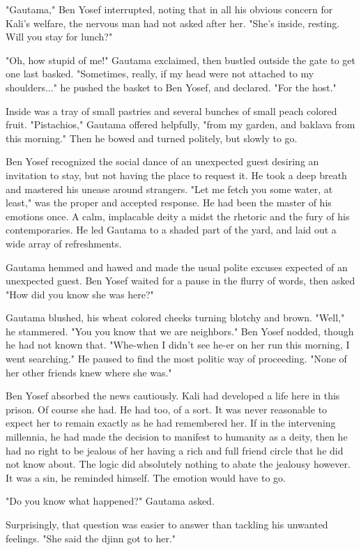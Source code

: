 \documentclass{amsart}
\begin{document}
"Gautama," Ben Yosef interrupted, noting that in all his obvious concern for Kali's welfare, the nervous man had not asked after her. "She's inside, resting. Will you stay for lunch?"

"Oh, how stupid of me!" Gautama exclaimed, then bustled outside the gate to get one last basked. "Sometimes, really, if my head were not attached to my shoulders..." he pushed the basket to Ben Yosef, and declared. "For the host." 

Inside was a tray of small pastries and several bunches of small peach colored fruit. "Pistachios," Gautama offered helpfully, "from my garden, and baklava from this morning." Then he bowed and turned politely, but slowly to go.

Ben Yosef recognized the social dance of an unexpected guest desiring an invitation to stay, but not having the place to request it. He took a deep breath and mastered his unease around strangers. "Let me fetch you some water, at least," was the proper and accepted response. He had been the master of his emotions once. A calm, implacable deity a midst the rhetoric and the fury of his contemporaries. He led Gautama to a shaded part of the yard, and laid out a wide array of refreshments. 

Gautama hemmed and hawed and made the usual polite excuses expected of an unexpected guest. Ben Yosef waited for a pause in the flurry of words, then asked "How did you know she was here?"

Gautama blushed, his wheat colored cheeks turning blotchy and brown. "Well," he stammered. "You you know that we are neighbors." Ben Yosef nodded, though he had not known that. "Whe-when I didn't see he-er on her run this morning, I went searching." He paused to find the most politic way of proceeding. "None of her other friends knew where she was." 

Ben Yosef absorbed the news cautiously. Kali had developed a life here in this prison. Of course she had. He had too, of a sort. It was never reasonable to expect her to remain exactly as he had remembered her. If in the intervening millennia, he had made the decision to manifest to humanity as a deity, then he had no right to be jealous of her having a rich and full friend circle that he did not know about. The logic did absolutely nothing to abate the jealousy however. It was a sin, he reminded himself. The emotion would have to go.

"Do you know what happened?" Gautama asked. 

Surprisingly, that question was easier to answer than tackling his unwanted feelings. "She said the djinn got to her." 
\end{document}
